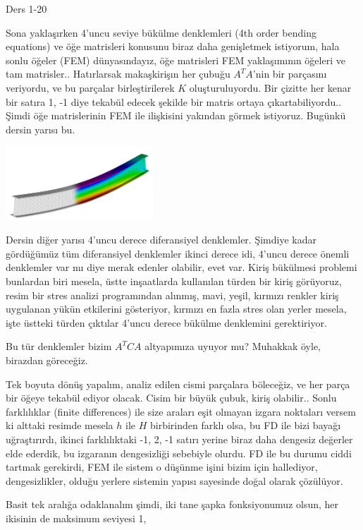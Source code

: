 \documentclass[12pt,fleqn]{article}\usepackage{../../common}
\begin{document}
Ders 1-20

Sona yaklaşırken 4'uncu seviye bükülme denklemleri (4th order bending equations)
ve öğe matrisleri konusunu biraz daha genişletmek istiyorum, hala sonlu öğeler
(FEM) dünyasındayız, öğe matrisleri FEM yaklaşımının öğeleri ve tam
matrisler.. Hatırlarsak makaşkirişın her çubuğu $A^T A$'nin bir parçasını
veriyordu, ve bu parçalar birleştirilerek $K$ oluşturuluyordu. Bir çizitte her
kenar bir satıra 1, -1 diye tekabül edecek şekilde bir matris ortaya
çıkartabiliyordu.. Şimdi öğe matrislerinin FEM ile ilişkisini yakından görmek
istiyoruz. Bugünkü dersin yarısı bu.

\includegraphics[width=15em]{compscieng_1_20_01.png}

Dersin diğer yarısı 4'uncu derece diferansiyel denklemler. Şimdiye kadar
gördüğümüz tüm diferansiyel denklemler ikinci derece idi, 4'uncu derece önemli
denklemler var mı diye merak edenler olabilir, evet var. Kiriş bükülmesi
problemi bunlardan biri mesela, üstte inşaatlarda kullanılan türden bir kiriş
görüyoruz, resim bir stres analizi programından alınmış, mavi, yeşil, kırmızı
renkler kiriş uygulanan yükün etkilerini gösteriyor, kırmızı en fazla stres olan
yerler mesela, işte üstteki türden çıktılar 4'uncu derece bükülme denklemini
gerektiriyor.

Bu tür denklemler bizim $A^T C A$ altyapımıza uyuyor mu? Muhakkak öyle,
birazdan göreceğiz. 

Tek boyuta dönüş yapalım, analiz edilen cismi parçalara böleceğiz, ve her parça
bir öğeye tekabül ediyor olacak. Cisim bir büyük çubuk, kiriş olabilir..  Sonlu
farklılıklar (finite differences) ile size araları eşit olmayan izgara noktaları
versem ki alttaki resimde mesela $h$ ile $H$ birbirinden farklı olsa, bu FD ile
bizi bayağı uğraştırırdı, ikinci farklılıktaki -1, 2, -1 satırı yerine biraz
daha dengesiz değerler elde ederdik, bu izgaranın dengesizliği sebebiyle
olurdu. FD ile bu durumu ciddi tartmak gerekirdi, FEM ile sistem o düşünme işini
bizim için hallediyor, dengesizlikler, olduğu yerlere sistemin yapısı
sayesinde doğal olarak çözülüyor. 

Basit tek aralığa odaklanalım şimdi, iki tane şapka fonksiyonumuz olsun, her
ikisinin de maksimum seviyesi 1,
\end{document}
